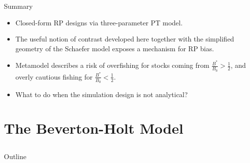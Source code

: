 \documentclass[ xcolor = pdftex, dvipsnames, table ]{beamer}
\begin{document}
%
\begin{frame}{Summary}
\begin{itemize}
\setlength\itemsep{1em}
	\item Closed-form RP designs via three-parameter PT model. %
	\item The useful notion of contrast developed here together with the simplified geometry of the 
	Schaefer model exposes a mechanism for RP bias.
	\item Metamodel describes a risk of overfishing for stocks coming from $\frac{B^*}{B_0}>\frac{1}{2}$, and overly cautious fishing for $\frac{B^*}{B_0}<\frac{1}{2}$. 
	\item What to do when the simulation design is not analytical?
\end{itemize}
\end{frame}

%
\section{The Beverton-Holt Model}
\subsection{}
\begin{frame}{Outline}
\end{frame}
\end{document}

